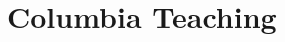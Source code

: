 \documentclass[11pt,a4paper,sans]{moderncv}        %
\begin{document}

\section{Columbia Teaching}
\end{document}
